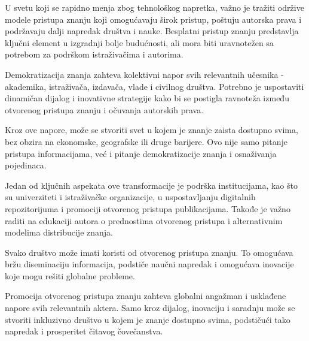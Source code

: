 \documentclass{article}
\begin{document}
U svetu koji se rapidno menja zbog tehnološkog napretka, važno je tražiti održive modele pristupa znanju koji omogućavaju širok pristup, poštuju autorska prava i podržavaju dalji napredak društva i nauke. Besplatni pristup znanju predstavlja ključni element u izgradnji bolje budućnosti, ali mora biti uravnotežen sa potrebom za podrškom istraživačima i autorima.

Demokratizacija znanja zahteva kolektivni napor svih relevantnih učesnika - akademika, istraživača, izdavača, vlade i civilnog društva. Potrebno je uspostaviti dinamičan dijalog i inovativne strategije kako bi se postigla ravnoteža između otvorenog pristupa znanju i očuvanja autorskih prava. 

Kroz ove napore, može se stvoriti svet u kojem je znanje zaista dostupno svima, bez obzira na ekonomske, geografske ili druge barijere. Ovo nije samo pitanje pristupa informacijama, već i pitanje demokratizacije znanja i osnaživanja pojedinaca. 

Jedan od ključnih aspekata ove transformacije je podrška institucijama, kao što su univerziteti i istraživačke organizacije, u uspostavljanju digitalnih repozitorijuma i promociji otvorenog pristupa publikacijama. Takođe je važno raditi na edukaciji autora o prednostima otvorenog pristupa i alternativnim modelima distribucije znanja.

Svako društvo može imati koristi od otvorenog pristupa znanju. To omogućava bržu diseminaciju informacija, podstiče naučni napredak i omogućava inovacije koje mogu rešiti globalne probleme. 

Promocija otvorenog pristupa znanju zahteva globalni angažman i usklađene napore svih relevantnih aktera. Samo kroz dijalog, inovaciju i saradnju može se stvoriti inkluzivno društvo u kojem je znanje dostupno svima, podstičući tako napredak i prosperitet čitavog čovečanstva.

















\newpage





\end{document}
